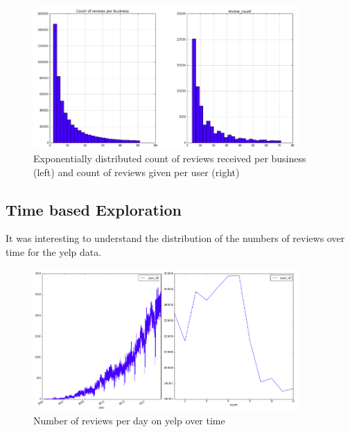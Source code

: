 \documentclass[11pt]{article}
\begin{document}
\begin{figure}[H]
\centering
\includegraphics[width=0.9\textwidth]{./ac209/countreviewshist.png}
\caption{Exponentially distributed count of reviews received per business (left) and count of reviews given per user (right)}
\end{figure}


\subsection*{Time based Exploration}
It was interesting to understand the distribution of the numbers of reviews over time for the yelp data.

\begin{figure}[H]
\centering
\includegraphics[width=0.9\textwidth]{./ac209/timeseries.png}
\caption{Number of reviews per day on yelp over time}
\end{figure}
\end{document}
